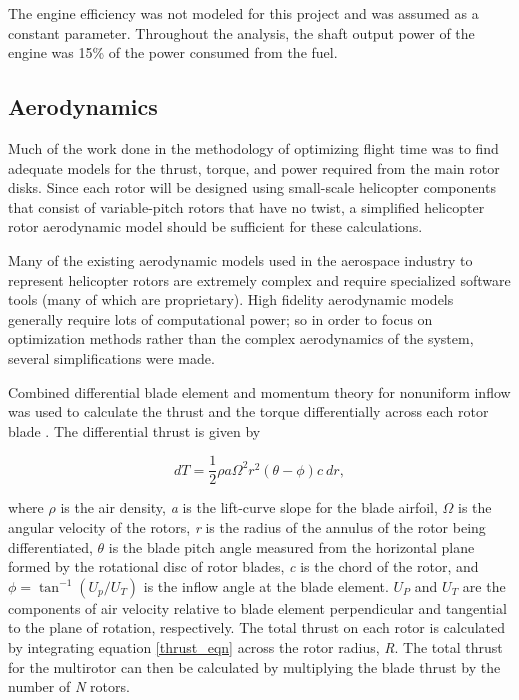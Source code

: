\documentclass[letterpaper, 10 pt, conference]{ieeeconf}  %
\begin{document}
The engine efficiency was not modeled for this project and was assumed as a constant parameter.  Throughout the analysis, the shaft output power of the engine was 15\% of the power consumed from the fuel.  

\subsection{Aerodynamics}

Much of the work done in the methodology of optimizing flight time was to find adequate models for the thrust, torque, and power required from the main rotor disks. Since each rotor will be designed using small-scale helicopter components that consist of variable-pitch rotors that have no twist, a simplified helicopter rotor aerodynamic model should be sufficient for these calculations. 

Many of the existing aerodynamic models used in the aerospace industry to represent helicopter rotors are extremely complex and require specialized software tools (many of which are proprietary). High fidelity aerodynamic models generally require lots of computational power; so in order to focus on optimization methods rather than the complex aerodynamics of the system, several simplifications were made.

Combined differential blade element and momentum theory for nonuniform inflow was used to calculate the thrust and the torque differentially across each rotor blade \cite{bramwell2001bramwell}. The differential thrust is given by

\begin{equation}
	dT = \frac{1}{2} \rho a \Omega^2 r^2 (\theta - \phi) c \  dr,
	\label{thrust_eqn}
\end{equation}

where $\rho$ is the air density, \textit{a} is the lift-curve slope for the blade airfoil, $\Omega$ is the angular velocity of the rotors, \textit{r} is the radius of the annulus of the rotor being differentiated, $\theta$ is the blade pitch angle measured from the horizontal plane formed by the rotational disc of rotor blades, \textit{c} is the chord of the rotor, and $\phi = \tan^{-1}(U_p/U_T) $ is the inflow angle at the blade element. $U_P$ and $U_T$ are the components of air velocity relative to blade element perpendicular and tangential to the plane of rotation, respectively. The total thrust on each rotor is calculated by integrating equation \ref{thrust_eqn} across the rotor radius, \textit{R}. The total thrust for the multirotor can then be calculated by multiplying the blade thrust by the number of \textit{N} rotors. 
\end{document}
